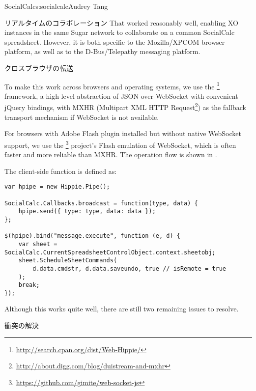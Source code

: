 \begin{aosachapter}{SocialCalc}{s:socialcalc}{Audrey Tang}
\begin{aosasect1}{リアルタイムのコラボレーション}
That worked reasonably well, enabling XO instances in the same Sugar
network to collaborate on a common SocialCalc spreadsheet.  However,
it is both specific to the Mozilla/XPCOM browser platform, as well as
to the D-Bus/Telepathy messaging platform.

\begin{aosasect2}{クロスブラウザの転送}

To make this work across browsers and operating systems, we use the
\footnote{\url{http://search.cpan.org/dist/Web-Hippie/}}
framework, a high-level abstraction of JSON-over-WebSocket with
convenient jQuery bindings, with MXHR (Multipart XML HTTP
Request\footnote{\url{http://about.digg.com/blog/duistream-and-mxhr}})
as the fallback transport mechanism if WebSocket is not available.

For browsers with Adobe Flash plugin installed but without native
WebSocket support, we use the
\footnote{\url{https://github.com/gimite/web-socket-js}}
project's Flash emulation of WebSocket, which is often faster and more reliable
than MXHR.  The operation flow is shown in .


\pagebreak

The client-side  function is
defined as:

\begin{verbatim}
var hpipe = new Hippie.Pipe();

SocialCalc.Callbacks.broadcast = function(type, data) {
    hpipe.send({ type: type, data: data });
};

$(hpipe).bind("message.execute", function (e, d) {
    var sheet = SocialCalc.CurrentSpreadsheetControlObject.context.sheetobj;
    sheet.ScheduleSheetCommands(
        d.data.cmdstr, d.data.saveundo, true // isRemote = true
    );
    break;
});
\end{verbatim}

\noindent Although this works quite well, there are still two remaining issues
to resolve.

\end{aosasect2}

\begin{aosasect2}{衝突の解決}


\end{aosasect2}
\end{aosasect1}
\end{aosachapter}

